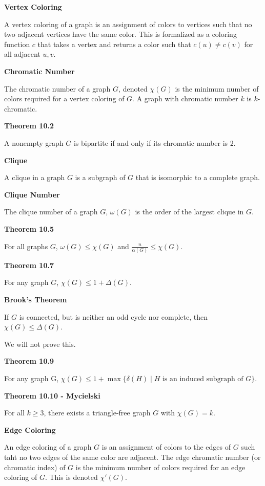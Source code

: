 \documentclass{article}
\begin{document}
\medskip\noindent\textbf{Vertex Coloring}

    A vertex coloring of a graph is an assignment of colors to vertices such that no two adjacent vertices have the same color.
    This is formalized as a coloring function $c$ that takes a vertex and returns a color such that $c(u) \neq c(v)$ for all adjacent $u,v$.

\medskip\noindent\textbf{Chromatic Number}

    The chromatic number of a graph $G$, denoted $\chi(G)$ is the minimum number of colors required for a vertex coloring of $G$.
    A graph with chromatic number $k$ is $k$-chromatic.

\medskip\noindent\textbf{Theorem 10.2}

    A nonempty graph $G$ is bipartite if and only if its chromatic number is 2.

\medskip\noindent\textbf{Clique}

    A clique in a graph $G$ is a subgraph of $G$ that is isomorphic to a complete graph.

\medskip\noindent\textbf{Clique Number}

    The clique number of a graph $G$, $\omega(G)$ is the order of the largest clique in $G$.

\medskip\noindent\textbf{Theorem 10.5}

    For all graphs $G$, $\omega(G) \leq \chi(G)$ and $\frac{n}{\alpha(G)} \leq \chi(G)$.

\medskip\noindent\textbf{Theorem 10.7}

    For any graph $G$, $\chi(G) \leq 1 + \Delta(G)$.

\medskip\noindent\textbf{Brook's Theorem}
    
    If $G$ is connected, but is neither an odd cycle nor complete, then $\chi(G) \leq \Delta(G)$.

    We will not prove this.

\medskip\noindent\textbf{Theorem 10.9}
    
    For any graph G, $\chi(G) \leq 1 + \max\{\delta(H) \mid H \text{ is an induced subgraph of } G\}$.

\medskip\noindent\textbf{Theorem 10.10 - Mycielski}

    For all $k \geq 3$, there exists a triangle-free graph $G$ with $\chi(G) = k$.

\medskip\noindent\textbf{Edge Coloring}

    An edge coloring of a graph $G$ is an assignment of colors to the edges of $G$ such taht no two edges of the same color are adjacent.
    The edge chromatic number (or chromatic index) of $G$ is the minimum number of colors required for an edge coloring of $G$.
    This is denoted $\chi'(G)$.
\end{document}
